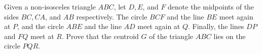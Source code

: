 Given a non-isosceles triangle $ABC$, let $D,E$, and $F$ denote the midpoints of the sides $BC,CA$, and $AB$ respectively. The circle $BCF$ and the line $BE$ meet again at $P$, and the circle $ABE$ and the line $AD$ meet again at $Q$. Finally, the lines $DP$ and $FQ$ meet at $R$. Prove that the centroid $G$ of the triangle $ABC$ lies on the circle $PQR$.